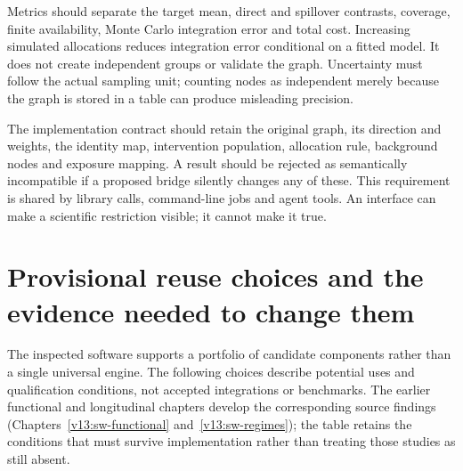 Metrics should separate the target mean, direct and spillover contrasts,
coverage, finite availability, Monte Carlo integration error and total cost.
Increasing simulated allocations reduces integration error conditional on a
fitted model. It does not create independent groups or validate the graph.
Uncertainty must follow the actual sampling unit; counting nodes as independent
merely because the graph is stored in a table can produce misleading precision.

The implementation contract should retain the original graph, its direction
and weights, the identity map, intervention population, allocation rule,
background nodes and exposure mapping. A result should be rejected as
semantically incompatible if a proposed bridge silently changes any of these.
This requirement is shared by library calls, command-line jobs and agent tools.
An interface can make a scientific restriction visible; it cannot make it true.

\section{Provisional reuse choices and the evidence needed to change them}

The inspected software supports a portfolio of candidate components rather
than a single universal engine. The following choices describe potential uses and qualification conditions,
not accepted integrations or benchmarks. The earlier functional and
longitudinal chapters develop the corresponding source findings
(Chapters~\ref{v13:sw-functional} and~\ref{v13:sw-regimes}); the table retains
the conditions that must survive implementation rather than treating those
studies as still absent.

